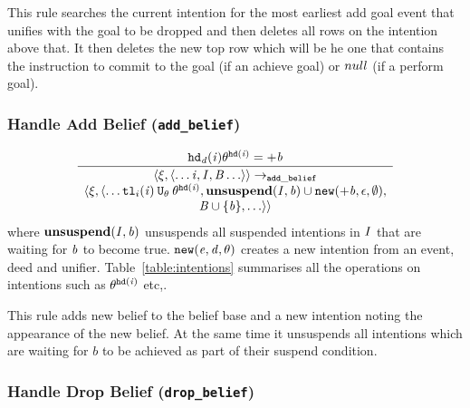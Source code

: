 This rule searches the current intention for the most earliest add goal event that unifies with the goal to be dropped and then deletes all rows on the intention above that.  It then deletes the new top row which will be he one that contains the instruction to commit to the goal (if an achieve goal) or $null$ (if a perform goal). 

\subsubsection*{Handle Add Belief ({\tt add\_belief})}

\begin{equation}
\frac{\mathit{{\tt hd}_d}(\mathit{i})\theta^{{\tt hd}(\mathit{i})}  = +\mathit{b}
}{
\begin{array}{c}
\langle \xi, \langle \ldots \mathit{i}, \mathit{I}, \mathit{B} \ldots \rangle \rangle \rightarrow_{\tt add\_belief} \\
\langle \xi, \langle \ldots
{\tt tl}_i(\mathit{i}) \: {\tt U}_{\theta} \: 
\theta^{{\tt hd}(\mathit{i})}, 
\bf unsuspend(\mathit{I}, \mathit{b}) \cup {\tt new}(\mathit{+\mathit{b}}, \epsilon, \emptyset), \\
\mathit{B} \cup \{\mathit{b}\}, \ldots \rangle \rangle
\end{array}
}
\end{equation}
where $\bf unsuspend(\mathit{I}, \mathit{b})$ unsuspends all suspended intentions in $\mathit{I}$ that are waiting for $\mathit{b}$ to become true.  ${\tt new}(\mathit{e}, \mathit{d}, \theta)$ creates a new intention from an event, deed and unifier. 
Table~\ref{table:intentions} summarises all the operations on intentions such as $\theta^{{\tt hd}(\mathit{i})}$ etc,.

This rule adds new belief to the belief base and a new intention noting the appearance of the new belief.  At the same time it unsuspends all intentions which are waiting for $b$ to be achieved as part of their suspend condition.

\subsubsection*{Handle Drop Belief ({\tt drop\_belief})}

